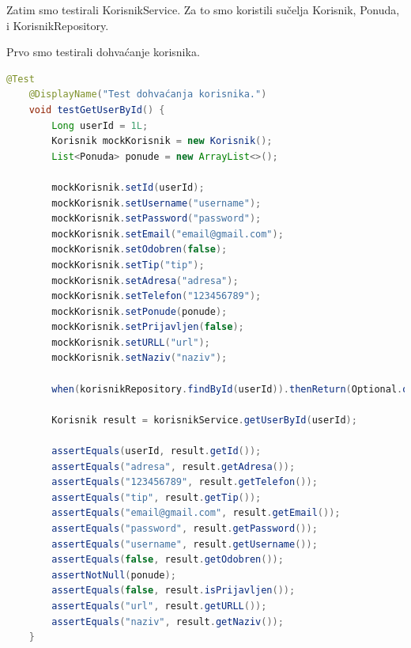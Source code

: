            Zatim smo testirali KorisnikService. Za to smo koristili sučelja Korisnik, Ponuda, i KorisnikRepository.
            
			Prvo smo testirali dohvaćanje korisnika. 
                  \begin{lstlisting}[language=Java, label=3st:java_example, basicstyle=\scriptsize, baselinestretch=0.9]
 @Test
    @DisplayName("Test dohvaćanja korisnika.")
    void testGetUserById() {
        Long userId = 1L;
        Korisnik mockKorisnik = new Korisnik();
        List<Ponuda> ponude = new ArrayList<>();

        mockKorisnik.setId(userId);
        mockKorisnik.setUsername("username");
        mockKorisnik.setPassword("password");
        mockKorisnik.setEmail("email@gmail.com");
        mockKorisnik.setOdobren(false);
        mockKorisnik.setTip("tip");
        mockKorisnik.setAdresa("adresa");
        mockKorisnik.setTelefon("123456789");
        mockKorisnik.setPonude(ponude);
        mockKorisnik.setPrijavljen(false);
        mockKorisnik.setURLL("url");
        mockKorisnik.setNaziv("naziv");

        when(korisnikRepository.findById(userId)).thenReturn(Optional.of(mockKorisnik));

        Korisnik result = korisnikService.getUserById(userId);

        assertEquals(userId, result.getId());
        assertEquals("adresa", result.getAdresa());
        assertEquals("123456789", result.getTelefon());
        assertEquals("tip", result.getTip());
        assertEquals("email@gmail.com", result.getEmail());
        assertEquals("password", result.getPassword());
        assertEquals("username", result.getUsername());
        assertEquals(false, result.getOdobren());
        assertNotNull(ponude);
        assertEquals(false, result.isPrijavljen());
        assertEquals("url", result.getURLL());
        assertEquals("naziv", result.getNaziv());
    }

    
\end{lstlisting}
            
